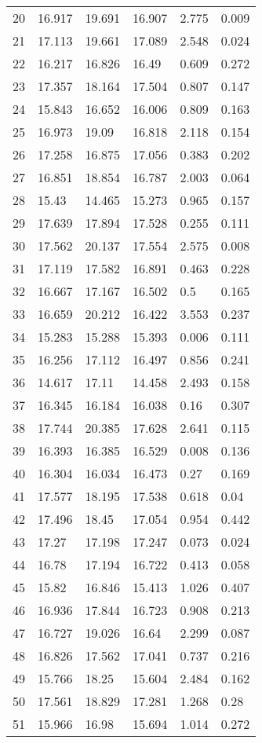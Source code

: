 \begin{longtable}{|l|l|l|l|l|l|}
        20 & 16.917 & 19.691 & 16.907 & 2.775 & 0.009 \\ 
        21 & 17.113 & 19.661 & 17.089 & 2.548 & 0.024 \\ 
        22 & 16.217 & 16.826 & 16.49 & 0.609 & 0.272 \\ 
        23 & 17.357 & 18.164 & 17.504 & 0.807 & 0.147 \\ 
        24 & 15.843 & 16.652 & 16.006 & 0.809 & 0.163 \\ 
        25 & 16.973 & 19.09 & 16.818 & 2.118 & 0.154 \\ 
        26 & 17.258 & 16.875 & 17.056 & 0.383 & 0.202 \\ 
        27 & 16.851 & 18.854 & 16.787 & 2.003 & 0.064 \\ 
        28 & 15.43 & 14.465 & 15.273 & 0.965 & 0.157 \\ 
        29 & 17.639 & 17.894 & 17.528 & 0.255 & 0.111 \\ 
        30 & 17.562 & 20.137 & 17.554 & 2.575 & 0.008 \\ 
        31 & 17.119 & 17.582 & 16.891 & 0.463 & 0.228 \\ 
        32 & 16.667 & 17.167 & 16.502 & 0.5 & 0.165 \\ 
        33 & 16.659 & 20.212 & 16.422 & 3.553 & 0.237 \\ 
        34 & 15.283 & 15.288 & 15.393 & 0.006 & 0.111 \\ 
        35 & 16.256 & 17.112 & 16.497 & 0.856 & 0.241 \\ 
        36 & 14.617 & 17.11 & 14.458 & 2.493 & 0.158 \\ 
        37 & 16.345 & 16.184 & 16.038 & 0.16 & 0.307 \\ 
        38 & 17.744 & 20.385 & 17.628 & 2.641 & 0.115 \\ 
        39 & 16.393 & 16.385 & 16.529 & 0.008 & 0.136 \\ 
        40 & 16.304 & 16.034 & 16.473 & 0.27 & 0.169 \\ 
        41 & 17.577 & 18.195 & 17.538 & 0.618 & 0.04 \\ 
        42 & 17.496 & 18.45 & 17.054 & 0.954 & 0.442 \\ 
        43 & 17.27 & 17.198 & 17.247 & 0.073 & 0.024 \\ 
        44 & 16.78 & 17.194 & 16.722 & 0.413 & 0.058 \\ 
        45 & 15.82 & 16.846 & 15.413 & 1.026 & 0.407 \\ 
        46 & 16.936 & 17.844 & 16.723 & 0.908 & 0.213 \\ 
        47 & 16.727 & 19.026 & 16.64 & 2.299 & 0.087 \\ 
        48 & 16.826 & 17.562 & 17.041 & 0.737 & 0.216 \\ 
        49 & 15.766 & 18.25 & 15.604 & 2.484 & 0.162 \\ 
        50 & 17.561 & 18.829 & 17.281 & 1.268 & 0.28 \\ 
        51 & 15.966 & 16.98 & 15.694 & 1.014 & 0.272 \\ \hline
\end{longtable}
